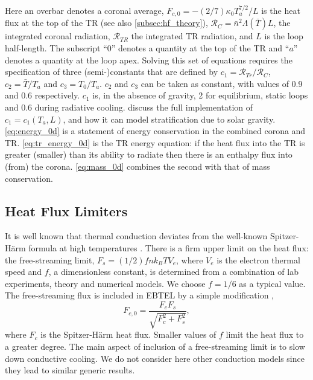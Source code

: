 \documentclass[apj]{emulateapj}
\begin{document}
Here an overbar denotes a coronal average, $F_{c,0} = -(2/7)\kappa_0 T_a^{7/2}/L$ is the heat flux at the top of the TR (see also \autoref{subsec:hf_theory}), $\mathcal{R}_C=\bar{n}^2\Lambda(\bar{T})L$, the integrated coronal radiation, $\mathcal{R}_{TR}$ the integrated TR radiation, and $L$ is the loop half-length. The subscript ``0'' denotes a quantity at the top of the TR and ``$a$'' denotes a quantity at the loop apex. Solving this set of equations requires the specification of three (semi-)constants that are defined by  $c_1=\mathcal{R}_{Tr}/\mathcal{R}_C$, $c_2=\bar{T}/T_a$ and $c_3=T_0/T_a$. $c_2$ and $c_3$ can be taken as constant, with values of 0.9 and 0.6 respectively. $c_1$ is, in the absence of gravity, 2 for equilibrium, static loops and 0.6 during radiative cooling. \citet{cargill_enthalpy-based_2012} discuss the full implementation of $c_1 = c_1(T_a,L)$, and how it can model stratification due to solar gravity. \autoref{eq:energy_0d} is a statement of energy conservation in the combined corona and TR. \autoref{eq:tr_energy_0d} is the TR energy equation: if the heat flux into the TR is greater (smaller) than its ability to radiate then there is an enthalpy flux into (from) the corona. \autoref{eq:mass_0d} combines the second with that of mass conservation.
	
	\subsection{Heat Flux Limiters}
	\label{subsec:hf_theory}
	\par It is well known that thermal conduction deviates from the well-known Spitzer-H{\"a}rm formula \citep{spitzer_transport_1953} at high temperatures \citep{ljepojevic_heat_1989}. There is a firm upper limit on the heat flux: the free-streaming limit, $F_s=(1/2)fnk_BTV_e$, where $V_e$ is the electron thermal speed and $f$, a dimensionless constant, is determined from a combination of lab experiments, theory and numerical models. We choose $f = 1/6$ as a typical value. The free-streaming flux is included in EBTEL by a simple modification \citep{klimchuk_highly_2008},
	\begin{equation}
		F_{c,0} = \frac{F_cF_s}{\sqrt{F_c^2 + F_s^2}},
	\end{equation}
where $F_c$ is the Spitzer-H{\"a}rm heat flux. Smaller values of $f$ limit the heat flux to a greater degree. The main aspect of inclusion of a free-streaming limit is to slow down conductive cooling. We do not consider here other conduction models \citep[e.g. the non-local model discussed in the coronal context by][]{karpen_nonlocal_1987,west_lifetime_2008} since they lead to similar generic results. 
\end{document}
